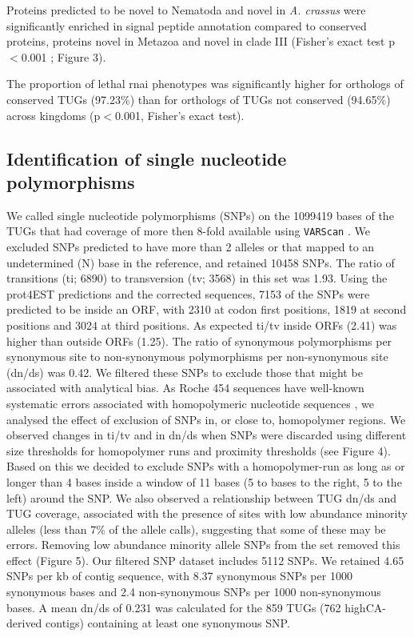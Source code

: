 \documentclass[10pt]{bmc_article}
\newenvironment{bmcformat}{\begin{raggedright}\baselineskip20pt\sloppy\setboolean{publ}{false}}{\end{raggedright}\baselineskip20pt\sloppy}
\begin{document}
\begin{bmcformat}
Proteins predicted to be novel to Nematoda and novel in
\textit{A. crassus} were significantly enriched in signal peptide
annotation compared to conserved proteins, proteins novel in Metazoa
and novel in clade III (Fisher's exact test p$<$0.001 ; Figure 3).

The proportion of lethal rnai phenotypes was significantly higher for
orthologs of conserved TUGs
(97.23\%) than for orthologs of
TUGs not conserved (94.65\%) across
kingdoms (p$<$0.001, Fisher's exact test).

\subsection*{Identification of single nucleotide polymorphisms}

We called single nucleotide polymorphisms (SNPs) on the
1099419 bases of the TUGs that had coverage of more then
8-fold available using \texttt{VARScan} \cite{pmid19542151}. We
excluded SNPs predicted to have more than 2 alleles or that mapped to
an undetermined (N) base in the reference, and retained
10458 SNPs. The ratio of transitions (ti;
6890) to transversion (tv;
3568) in this set was
1.93. Using the prot4EST
predictions and the corrected sequences, 7153 of
the SNPs were predicted to be inside an ORF, with
2310 at codon first positions,
1819 at second positions and 3024
at third positions. As expected ti/tv inside ORFs
(2.41) was higher than outside ORFs
(1.25). The ratio of synonymous polymorphisms per
synonymous site to non-synonymous polymorphisms per non-synonymous
site (dn/ds) was 0.42. We filtered these SNPs to exclude
those that might be associated with analytical bias. As Roche 454
sequences have well-known systematic errors associated with
homopolymeric nucleotide sequences \cite{pmid21685085}, we analysed
the effect of exclusion of SNPs in, or close to, homopolymer
regions. We observed changes in ti/tv and in dn/ds when SNPs were
discarded using different size thresholds for homopolymer runs and
proximity thresholds (see Figure 4). Based on this we decided to
exclude SNPs with a homopolymer-run as long as or longer than 4 bases
inside a window of 11 bases (5 to bases to the right, 5 to the left)
around the SNP. We also observed a relationship between TUG dn/ds and
TUG coverage, associated with the presence of sites with low abundance
minority alleles (less than 7\% of the allele calls), suggesting that
some of these may be errors. Removing low abundance minority allele
SNPs from the set removed this effect (Figure 5).  Our filtered SNP
dataset includes 5112 SNPs. We retained
4.65 SNPs per kb of contig sequence, with
8.37 synonymous SNPs per 1000 synonymous bases and
2.4 non-synonymous SNPs per 1000 non-synonymous
bases. A mean dn/ds of 0.231 was
calculated for the 859 TUGs
(762 highCA-derived contigs)
containing at least one synonymous SNP.


\end{bmcformat}
\end{document}
